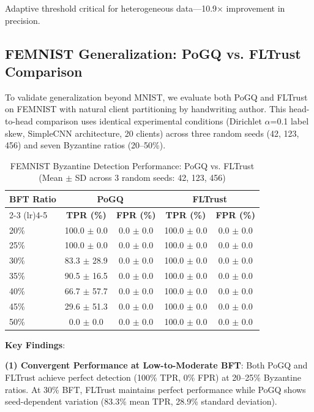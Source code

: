 Adaptive threshold critical for heterogeneous data---10.9× improvement in precision.

\subsection{FEMNIST Generalization: PoGQ vs. FLTrust Comparison}

To validate generalization beyond MNIST, we evaluate both PoGQ and FLTrust~\cite{cao2021fltrust} on FEMNIST with natural client partitioning by handwriting author. This head-to-head comparison uses identical experimental conditions (Dirichlet $\alpha$=0.1 label skew, SimpleCNN architecture, 20 clients) across three random seeds (42, 123, 456) and seven Byzantine ratios (20--50\%).

\begin{table}[t]
\centering
\caption{FEMNIST Byzantine Detection Performance: PoGQ vs. FLTrust (Mean $\pm$ SD across 3 random seeds: 42, 123, 456)}
\label{tab:femnist-comparison}
\begin{tabular}{lcccc}
\toprule
\textbf{BFT Ratio} & \multicolumn{2}{c}{\textbf{PoGQ}} & \multicolumn{2}{c}{\textbf{FLTrust}} \\
\cmidrule(lr){2-3} \cmidrule(lr){4-5}
 & \textbf{TPR (\%)} & \textbf{FPR (\%)} & \textbf{TPR (\%)} & \textbf{FPR (\%)} \\
\midrule
20\% & 100.0 $\pm$ 0.0 & 0.0 $\pm$ 0.0 & 100.0 $\pm$ 0.0 & 0.0 $\pm$ 0.0 \\
25\% & 100.0 $\pm$ 0.0 & 0.0 $\pm$ 0.0 & 100.0 $\pm$ 0.0 & 0.0 $\pm$ 0.0 \\
30\% & 83.3 $\pm$ 28.9 & 0.0 $\pm$ 0.0 & 100.0 $\pm$ 0.0 & 0.0 $\pm$ 0.0 \\
35\% & 90.5 $\pm$ 16.5 & 0.0 $\pm$ 0.0 & 100.0 $\pm$ 0.0 & 0.0 $\pm$ 0.0 \\
40\% & 66.7 $\pm$ 57.7 & 0.0 $\pm$ 0.0 & 100.0 $\pm$ 0.0 & 0.0 $\pm$ 0.0 \\
45\% & 29.6 $\pm$ 51.3 & 0.0 $\pm$ 0.0 & 100.0 $\pm$ 0.0 & 0.0 $\pm$ 0.0 \\
50\% & 0.0 $\pm$ 0.0 & 0.0 $\pm$ 0.0 & 100.0 $\pm$ 0.0 & 0.0 $\pm$ 0.0 \\
\bottomrule
\end{tabular}
\vspace{-0.1in}
\end{table}

\textbf{Key Findings}:

\textbf{(1) Convergent Performance at Low-to-Moderate BFT}: Both PoGQ and FLTrust achieve perfect detection (100\% TPR, 0\% FPR) at 20--25\% Byzantine ratios. At 30\% BFT, FLTrust maintains perfect performance while PoGQ shows seed-dependent variation (83.3\% mean TPR, 28.9\% standard deviation).

